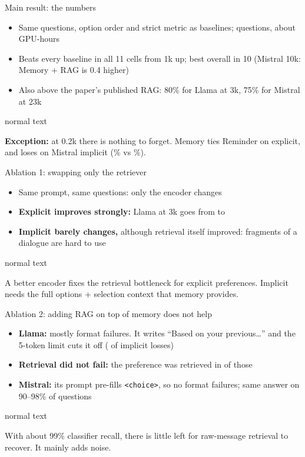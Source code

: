 \documentclass[aspectratio=169,11pt]{beamer}
\newcommand{\takeaway}[1]{\vspace{4pt}\begin{beamercolorbox}[sep=6pt,rounded=true]{normal text}\colorbox{boxblue}{\parbox{0.93\linewidth}{\small #1}}\end{beamercolorbox}}
\begin{document}
\begin{frame}{Main result: the numbers}
\centering
\resizebox{0.88\linewidth}{!}{}
\vspace{2pt}
\begin{itemize}\footnotesize
  \item Same questions, option order and strict metric as baselines; \qTotalQ{} questions, about \qGpuHours{} GPU-hours
  \item Beats every baseline in all 11 cells from 1k up; best overall in 10 (Mistral 10k: Memory + RAG is 0.4 higher)
  \item Also above the paper's published RAG: 80\% for Llama at 3k, 75\% for Mistral at 23k
\end{itemize}
\takeaway{\textbf{Exception:} at 0.2k there is nothing to forget. Memory ties Reminder on explicit, and loses on Mistral implicit (\qMiImMemZero\% vs \qMiImRemZero\%).}
\end{frame}

\begin{frame}{Ablation 1: swapping only the retriever}
\centering\small
\resizebox{0.9\linewidth}{!}{}
\vspace{6pt}
\begin{itemize}\small
  \item Same prompt, same questions: only the encoder changes
  \item \textbf{Explicit improves strongly:} Llama at 3k goes from \qLlExRagThree{} to \qLlExGemThree
  \item \textbf{Implicit barely changes,} although retrieval itself improved: fragments of a dialogue are hard to use
\end{itemize}
\takeaway{A better encoder fixes the retrieval bottleneck for explicit preferences. Implicit needs the full options + selection context that memory provides.}
\end{frame}

\begin{frame}{Ablation 2: adding RAG on top of memory does not help}
\centering\small
\resizebox{\linewidth}{!}{}
\vspace{6pt}
\begin{itemize}\small
  \item \textbf{Llama:} mostly format failures. It writes ``Based on your previous\ldots'' and the 5-token limit cuts it off (\qLostImParse{} of \qLostIm{} implicit losses)
  \item \textbf{Retrieval did not fail:} the preference was retrieved in \qLostImGold{} of those \qLostIm{}
  \item \textbf{Mistral:} its prompt pre-fills \texttt{<choice>}, so no format failures; same answer on 90--98\% of questions
\end{itemize}
\takeaway{With about 99\% classifier recall, there is little left for raw-message retrieval to recover. It mainly adds noise.}
\end{frame}
\end{document}
